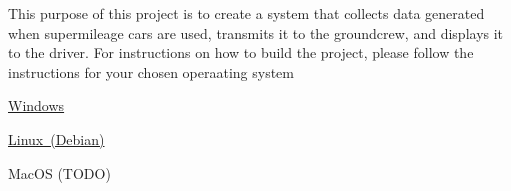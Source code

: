 This purpose of this project is to create a system that collects data generated when supermileage cars are used, transmits it to the groundcrew, and displays it to the driver. For instructions on how to build the project, please follow the instructions for your chosen operaating system
\begin{DoxyItemize}
\item \mbox{\hyperlink{md_Instructions_WindowsSetup}{Windows}}
\item \mbox{\hyperlink{md_Instructions_LinuxSetup}{Linux (Debian)}}
\item Mac\+OS (T\+O\+DO) 
\end{DoxyItemize}